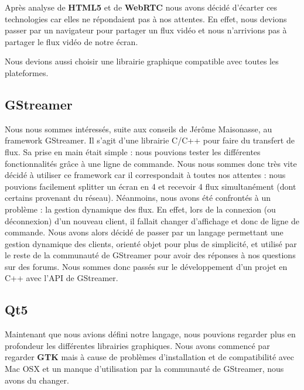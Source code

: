 \documentclass[a4paper, 11pt]{article}
\begin{document}
Après analyse de \textbf{HTML5} et de \textbf{WebRTC} nous avons décidé d'écarter ces technologies car elles ne répondaient pas à nos attentes. En effet, nous devions passer par un navigateur pour partager un flux vidéo et nous n'arrivions pas à partager le flux vidéo de notre écran.

Nous devions aussi choisir une librairie graphique compatible avec toutes les plateformes.

\subsection{GStreamer}

Nous nous sommes intéressés, suite aux conseils de Jérôme Maisonasse, au framework GStreamer. Il s'agit d'une librairie C/C++ pour faire du transfert de flux. Sa prise en main était simple : nous pouvions tester les différentes fonctionnalités grâce à une ligne de commande. Nous nous sommes donc très vite décidé à utiliser ce framework car il correspondait à toutes nos attentes : nous pouvions facilement splitter un écran en 4 et recevoir 4 flux simultanément (dont certains provenant du réseau). Néanmoins, nous avons été confrontés à un problème : la gestion dynamique des flux. En effet, lors de la connexion (ou déconnexion) d'un nouveau client, il fallait changer d'affichage et donc de ligne de commande. Nous avons alors décidé de passer par un langage permettant une gestion dynamique des clients, orienté objet pour plus de simplicité, et utilisé par le reste de la communauté de GStreamer pour avoir des réponses à nos questions sur des forums. Nous sommes donc passés sur le développement d'un projet en C++ avec l'API de GStreamer.

\subsection{Qt5}

Maintenant que nous avions défini notre langage, nous pouvions regarder plus en profondeur les différentes librairies graphiques. Nous avons commencé par regarder \textbf{GTK} mais à cause de problèmes d'installation et de compatibilité avec Mac OSX et un manque d'utilisation par la communauté de GStreamer, nous avons du changer. 
\end{document}
